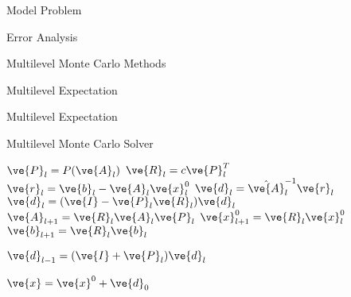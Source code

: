 \documentclass{beamer}
\begin{document}
\begin{frame}{Model Problem}

\end{frame}

\begin{frame}{Error Analysis}

\end{frame}

\begin{frame}{Multilevel Monte Carlo Methods}

\end{frame}

\begin{frame}{Multilevel Expectation}

\end{frame}

\begin{frame}{Multilevel Expectation}

\end{frame}

\begin{frame}[fragile]{Multilevel Monte Carlo Solver}

  \begin{algorithm}[H]
    \caption{Multilevel Monte Carlo Method}
    \label{alg:mlamc}
    \begin{algorithmic}[1]
      { \small
      \STATE  $\ve{P}_l = P(\ve{A}_l)$
      \STATE $\ve{R}_l = c \ve{P}_l^T$
      \STATE $\ve{r}_l = \ve{b}_l - \ve{A}_l \ve{x}_l^0$
      \STATE $\ve{d}_l = \hat{\ve{A}}_l^{-1} \ve{r}_l$
      \STATE $\ve{d}_l = (\ve{I} - \ve{P}_l\ve{R}_l) \ve{d}_{l}$
      \STATE $\ve{A}_{l+1} = \ve{R}_l \ve{A}_l \ve{P}_l$
      \STATE $\ve{x}_{l+1}^0 = \ve{R}_l \ve{x}_l^0$
      \STATE $\ve{b}_{l+1} = \ve{R}_l \ve{b}_l$
      \ENDIF
      \ENDFOR

      \STATE $\ve{d}_{l-1} = ( \ve{I} + \ve{P}_{l} ) \ve{d}_{l}$
      \ENDFOR

      \STATE $\ve{x} = \ve{x}^0 + \ve{d}_0$
      }
    \end{algorithmic}
  \end{algorithm}

\end{frame}
\end{document}
